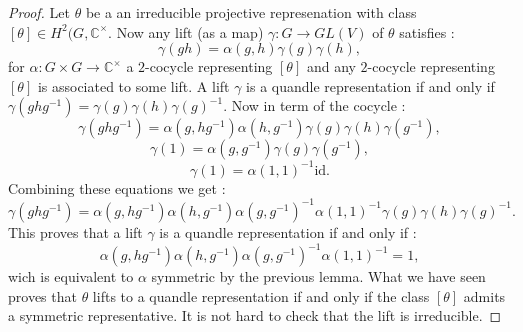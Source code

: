 \documentclass[10pt,a4paper]{amsart}
\begin{document}
\begin{proof}
Let $\theta$ be a an irreducible projective represenation with class $[\theta]\in H^2(G,\mathbb{C}^\times$. Now any lift (as a map) $\gamma : G \to GL(V)$ of $\theta$ satisfies :
$$\gamma(gh)=\alpha(g,h)\gamma(g)\gamma(h),$$
for $\alpha : G\times G\to \mathbb{C}^\times$ a $2$-cocycle representing $[\theta]$ and any $2$-cocycle representing $[\theta]$ is associated to some lift. A lift $\gamma$ is a quandle representation if and only if $\gamma(ghg^{-1})=\gamma(g)\gamma(h)\gamma(g)^{-1}$. Now in term of the cocycle : 
$$\gamma(ghg^{-1})=\alpha(g,hg^{-1})\alpha(h,g^{-1})\gamma(g)\gamma(h)\gamma(g^{-1}),$$
$$\gamma(1)=\alpha(g,g^{-1})\gamma(g)\gamma(g^{-1}),$$
$$\gamma(1)=\alpha(1,1)^{-1}\mathrm{id}.$$
Combining these equations we get :
$$\gamma(ghg^{-1})=\alpha(g,hg^{-1})\alpha(h,g^{-1})\alpha(g,g^{-1})^{-1}\alpha(1,1)^{-1}\gamma(g)\gamma(h)\gamma(g)^{-1}.$$
This proves that a lift $\gamma$ is a quandle representation if and only if :
$$\alpha(g,hg^{-1})\alpha(h,g^{-1})\alpha(g,g^{-1})^{-1}\alpha(1,1)^{-1}=1,$$
wich is equivalent to $\alpha$ symmetric by the previous lemma. What we have seen proves that $\theta$ lifts to a quandle representation if and only if the class $[\theta]$ admits a symmetric representative. It is not hard to check that the lift is irreducible.
\end{proof}
\end{document}
